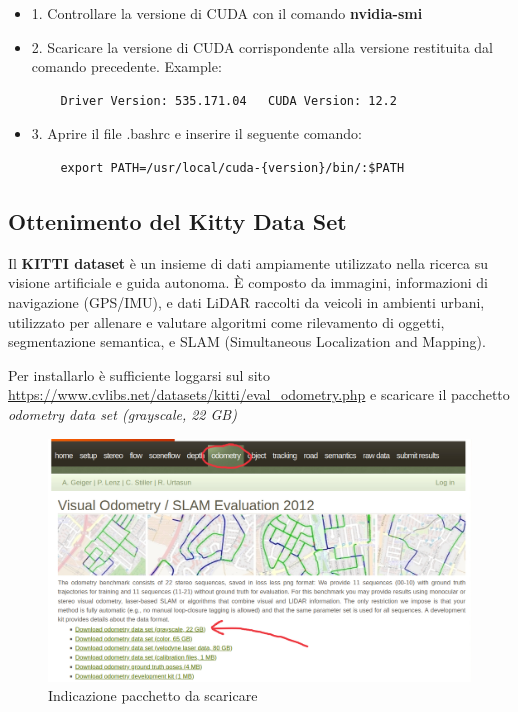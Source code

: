 \documentclass[12pt,a4paper]{report}
\begin{document}
\begin{itemize}
    \item 1. Controllare la versione di CUDA con il comando \textbf{nvidia-smi}
    \item 2. Scaricare la versione di CUDA corrispondente alla versione restituita dal comando precedente. Example: 
    \begin{verbatim}
    Driver Version: 535.171.04   CUDA Version: 12.2
    \end{verbatim}
    
    \item 3. Aprire il file .bashrc e inserire il seguente comando:
    \begin{verbatim}
    export PATH=/usr/local/cuda-{version}/bin/:$PATH
    \end{verbatim}
\end{itemize}

\subsection{Ottenimento del Kitty Data Set}

Il \textbf{KITTI dataset} è un insieme di dati ampiamente utilizzato nella ricerca su visione artificiale e guida autonoma. È composto da immagini, informazioni di navigazione (GPS/IMU), e dati LiDAR raccolti da veicoli in ambienti urbani, utilizzato per allenare e valutare algoritmi come rilevamento di oggetti, segmentazione semantica, e SLAM (Simultaneous Localization and Mapping).

Per installarlo è sufficiente loggarsi sul sito \url{https://www.cvlibs.net/datasets/kitti/eval_odometry.php} e scaricare il pacchetto \textit{odometry data set (grayscale, 22 GB)}

\begin{figure}[h]
    \centering
    \includegraphics[width=0.9\linewidth]{img/kitti_dataset.png}
    \caption{Indicazione pacchetto da scaricare}
\end{figure}
\end{document}

